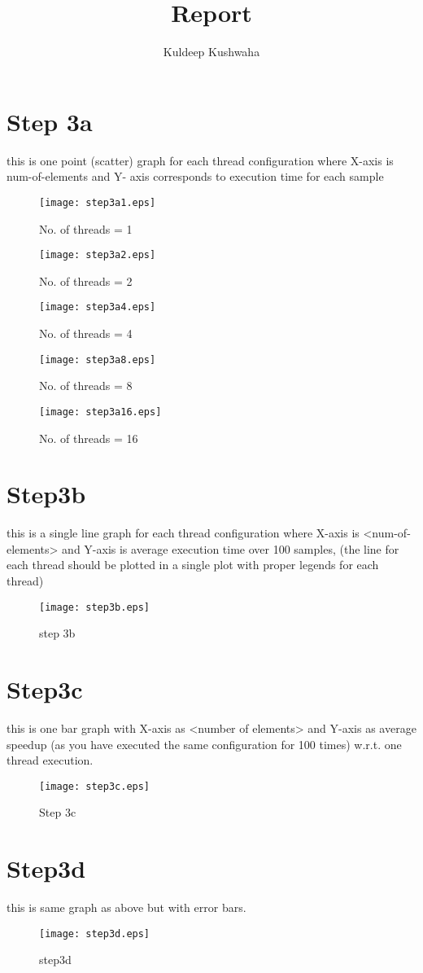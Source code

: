 \documentclass{article}
\title{Report}
\author{Kuldeep Kushwaha }
\begin{document}
\maketitle

\section{Step 3a}
this is one point (scatter) graph for each thread configuration where X-axis is num-of-elements and Y-
axis corresponds to execution time for each sample
\begin{figure}[h!]
\centering
\texttt{[image: step3a1.eps]}
\caption{No. of threads = 1}
\label{fig:universe}
\end{figure}

\begin{figure}[h!]
\centering
\texttt{[image: step3a2.eps]}
\caption{No. of threads = 2}
\label{fig:universe}
\end{figure}

\begin{figure}[h!]
\centering
\texttt{[image: step3a4.eps]}
\caption{No. of threads = 4}
\label{fig:universe}
\end{figure}

\begin{figure}[h!]
\centering
\texttt{[image: step3a8.eps]}
\caption{No. of threads = 8}
\label{fig:universe}
\end{figure}

\begin{figure}[h!]
\centering
\texttt{[image: step3a16.eps]}
\caption{No. of threads = 16}
\label{fig:universe}
\end{figure}

\section{Step3b}
this is a single line graph for each thread configuration where X-axis is <num-of-elements> and Y-axis is
average execution time over 100 samples, (the line for each thread should be plotted in a single plot
with proper legends for each thread)
\begin{figure}[h!]
\centering
\texttt{[image: step3b.eps]}
\caption{step 3b}
\label{fig:universe}
\end{figure}

\section{Step3c}
this is one bar graph with X-axis as <number of elements> and Y-axis as average speedup (as you have
executed the same configuration for 100 times) w.r.t. one thread execution.
\begin{figure}[h!]
\centering
\texttt{[image: step3c.eps]}
\caption{Step 3c}
\label{fig:universe}
\end{figure}

\section{Step3d}
this is same graph as above but with error bars.
\begin{figure}[h!]
\centering
\texttt{[image: step3d.eps]}
\caption{step3d}
\label{fig:universe}
\end{figure}
\end{document}
